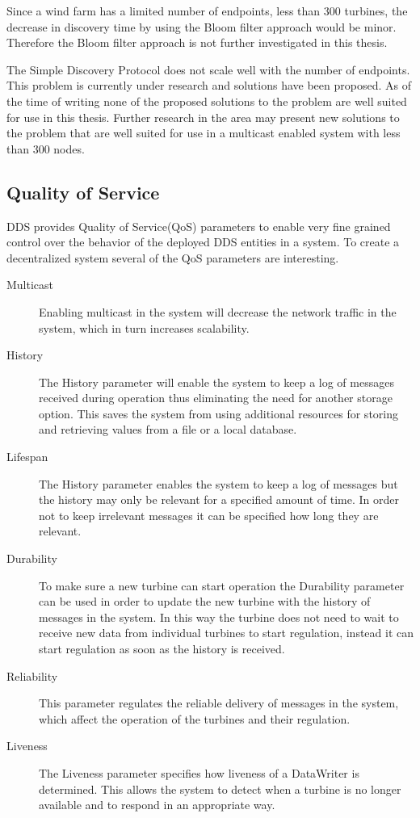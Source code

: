 Since a wind farm has a limited number of endpoints, less than 300 turbines, the decrease in discovery time by using the Bloom filter approach would be minor. Therefore the Bloom filter approach is not further investigated in this thesis. \newline

The Simple Discovery Protocol does not scale well with the number of endpoints. This problem is currently under research and solutions have been proposed. As of the time of writing none of the proposed solutions to the problem are well suited for use in this thesis. Further research in the area may present new solutions to the problem that are well suited for use in a multicast enabled system with less than 300 nodes.

\subsection{Quality of Service}
DDS provides Quality of Service(QoS) parameters to enable very fine grained control over the behavior of the deployed DDS entities in a system. To create a decentralized system several of the QoS parameters are interesting.

\begin{description}
	\item [Multicast] Enabling multicast in the system will decrease the network traffic in the system, which in turn increases scalability.
		
	\item [History] The History parameter will enable the system to keep a log of messages received during operation thus eliminating the need for another storage option. This saves the system from using additional resources for storing and retrieving values from a file or a local database.
		
	\item [Lifespan] The History parameter enables the system to keep a log of messages but the history may only be relevant for a specified amount of time. In order not to keep irrelevant messages it can be specified how long they are relevant.
	
	\item [Durability] To make sure a new turbine can start operation the Durability parameter can be used in order to update the new turbine with the history of messages in the system. In this way the turbine does not need to wait to receive new data from individual turbines to start regulation, instead it can start regulation as soon as the history is received.
		
	\item [Reliability] This parameter regulates the reliable delivery of messages in the system, which affect the operation of the turbines and their regulation.
		
	\item [Liveness] The Liveness parameter specifies how liveness of a DataWriter is determined. This allows the system to detect when a turbine is no longer available and to respond in an appropriate way.
\end{description}

